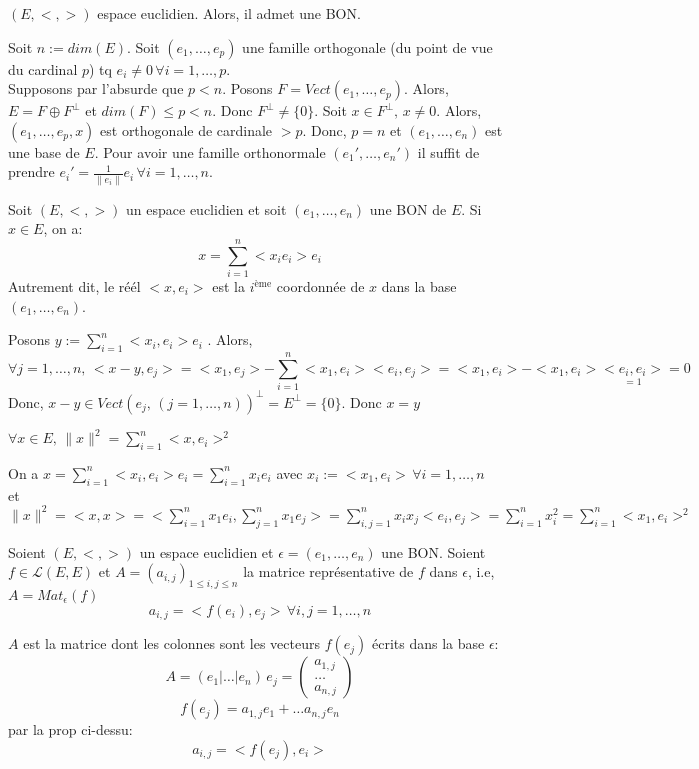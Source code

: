 \begin{theorem}
    $(E, <,>)$ espace euclidien. Alors, il admet une BON.
\end{theorem}
\begin{preuve}
   Soit $n := dim(E)$. Soit  $(e_1, \ldots, e_p)$ une famille orthogonale (du point de vue du cardinal $p$) tq  $e_i \neq 0 \, \forall i = 1, \ldots, p$.\\
   Supposons par l'absurde que $p < n$. Posons  $F = Vect(e_1, \ldots, e_p)$. Alors, $E = F \oplus F^{\perp}$ et  $dim(F) \le p < n$. Donc $F^{\perp} \neq  \{0\}$. Soit $x \in F^{\perp}, \, x \neq 0$. Alors, $(e_1, \ldots, e_p, x)$ est orthogonale de cardinale $> p$. Donc,  $p = n$ et  $(e_1, \ldots, e_n)$ est une base de $E$. Pour avoir une famille orthonormale  $(e_1', \ldots, e_n')$ il suffit de prendre $e_i' = \frac{1}{\|e_i\|}e_i \, \forall i = 1, \ldots, n$.
\end{preuve}
\begin{prop}
   Soit $(E, <,>)$ un espace euclidien et soit  $(e_1, \ldots, e_n)$ une BON de $E$. Si  $x \in E$, on a:
   \[
   x = \sum_{i=1}^{n} <x_ie_i>e_i
   \] 
   Autrement dit, le réél $<x, e_i>$ est la  $i^{\text{ème}}$ coordonnée de $x$ dans la base  $(e_1, \ldots, e_n)$.
\end{prop}
\begin{preuve}
   Posons $y := \sum_{i=1}^{n} <x_i, e_i>e_i$ . Alors, 
   \[
       \forall j = 1, \ldots, n, \, <x - y, e_j> = <x_1,e_j> - \sum_{i=1}^{n} <x_1, e_i><e_i,e_j> = <x_1,e_i> - <x_1,e_i>\underset{= 1}{<e_i, e_i>} = 0
   \] 
   Donc, $x - y \in Vect(e_j, \, (j = 1, \ldots, n))^{\perp} = E^{\perp} = \{0\}$. Donc $x = y$
\end{preuve}
\begin{corollary}
   $\forall x \in E, \, \|x\|^2 = \sum_{i=1}^{n} <x, e_i>^2$ 
\end{corollary}
\begin{preuve}
   On a $x = \sum_{i=1}^{n} <x_i, e_i>e_i = \sum_{i=1}^{n} x_ie_i$ avec $x_i := <x_1, e_i> \, \forall i = 1,\ldots,n$\\ 
   et $\|x\|^2 = <x, x> = <\sum_{i=1}^{n} x_1e_i, \sum_{j=1}^{n} x_1e_j> = \sum_{i, j=1}^{n} x_ix_j<e_i, e_j> = \sum_{i=1}^{n} x_i^2 = \sum_{i=1}^{n} <x_1, e_i>^2$
\end{preuve}
\begin{prop} Soient $(E, <,>)$ un espace euclidien et $\epsilon = (e_1, \ldots, e_n)$ une BON. Soient $f \in \mathcal{L}(E, E)$ et $A = (a_{i,j})_{1 \le i,j \le n}$ la matrice représentative de $f$ dans  $\epsilon$, i.e,  $A = Mat_{\epsilon}(f)$ 
    \[
        a_{i,j} = <f(e_i), e_j> \, \forall i,j = 1, \ldots, n
    \] 
\end{prop}
\begin{preuve}
   $A$ est la matrice dont les colonnes sont les vecteurs  $f(e_j)$ écrits dans la base $\epsilon$:
    \[
        A = (e_1 | \ldots | e_n)\, e_j = \begin{pmatrix} a_{1,j}\\ \ldots\\ a_{n, j} \end{pmatrix} 
   \] 
   \[
       f(e_j) = a_{1, j}e_1 + \ldots a_{n, j}e_n
   \] 
   par la prop ci-dessu:
   \[
       a_{i, j} = <f(e_j), e_i>
   \] 
\end{preuve}
